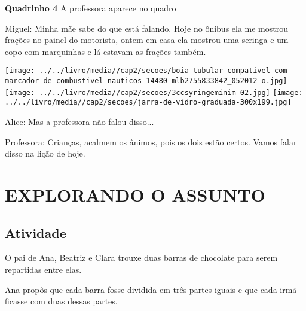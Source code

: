 \documentclass[a4,12pt]{book}
\begin{document}
\begin{imagem*}[breakable]{}{}
  {\bf Quadrinho 4}  
  A professora aparece no quadro  
  
  Miguel: Minha mãe sabe do que está falando. Hoje no ônibus ela me mostrou frações no painel do motorista, ontem em casa ela mostrou uma seringa e um copo com marquinhas e lá estavam as frações também.  
  
    \texttt{[image: ../../livro/media//cap2/secoes/boia-tubular-compativel-com-marcador-de-combustivel-nauticos-14480-mlb2755833842\_052012-o.jpg]}   
    \texttt{[image: ../../livro/media//cap2/secoes/3ccsyringeminim-02.jpg]}    
    \texttt{[image: ../../livro/media//cap2/secoes/jarra-de-vidro-graduada-300x199.jpg]}  
  
  
  Alice: Mas a professora não falou disso...  
  
  Professora: Crianças, acalmem os ânimos, pois os dois estão certos. Vamos falar disso na lição de hoje.
  
\end{imagem*}

\section{EXPLORANDO O ASSUNTO }

\subsection{Atividade}

O pai de Ana, Beatriz e Clara trouxe duas barras de chocolate para serem repartidas entre elas.

\begin{center}
\end{center}

Ana propôs que cada barra fosse dividida em três partes iguais e que cada irmã ficasse com duas dessas partes.
\end{document}
